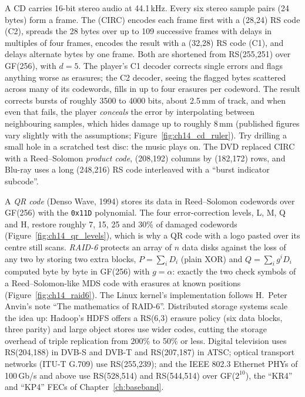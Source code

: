 \begin{inpractice}
A CD carries 16-bit stereo audio at 44.1\,kHz. Every six stereo sample pairs (24 bytes) form a
frame. The  (CIRC) encodes each frame first with a
(28,24) RS code (C2), spreads the 28 bytes over up to 109 successive frames with delays in multiples
of four frames, encodes the result with a (32,28) RS code (C1), and delays alternate bytes by one
frame. Both are shortened from RS(255,251) over GF(256), with $d=5$. The player's C1 decoder corrects
single errors and flags anything worse as erasures; the C2 decoder, seeing the flagged bytes scattered
across many of its codewords, fills in up to four erasures per codeword. The result corrects bursts
of roughly 3500 to 4000 bits, about 2.5\,mm of track, and when even that fails, the player
\emph{conceals} the error by interpolating between neighbouring samples, which hides damage up to
roughly 8\,mm (published figures vary slightly with the assumptions;
Figure~\ref{fig:ch14_cd_ruler}). Try drilling a small hole in a scratched test disc: the music plays
on. The DVD replaced CIRC with a Reed--Solomon \emph{product code}, (208,192) columns by (182,172)
rows, and Blu-ray uses a long (248,216) RS code interleaved with a ``burst indicator subcode''.
\end{inpractice}


\begin{inpractice}
A \emph{QR code} (Denso Wave, 1994) stores its data in Reed--Solomon codewords over GF(256) with
the \texttt{0x11D} polynomial. The four error-correction levels, L, M, Q and H, restore roughly 7, 15,
25 and 30\% of damaged codewords (Figure~\ref{fig:ch14_qr_levels}), which is why a QR code with a
logo pasted over its centre still scans. \emph{RAID-6} protects an array of $n$ data disks against
the loss of any two by storing two extra blocks, $P=\sum_iD_i$ (plain XOR) and $Q=\sum_i g^iD_i$
computed byte by byte in GF(256) with $g=\alpha$: exactly the two check symbols of a
Reed--Solomon-like MDS code with erasures at known positions (Figure~\ref{fig:ch14_raid6}). The Linux
kernel's implementation follows H.~Peter Anvin's note ``The mathematics of RAID-6''. Distributed
storage systems scale the idea up: Hadoop's HDFS offers a RS(6,3) erasure policy (six data blocks,
three parity) and large object stores use wider codes, cutting the storage overhead of triple
replication from 200\% to 50\% or less. Digital television uses RS(204,188) in DVB-S and DVB-T and
RS(207,187) in ATSC; optical transport networks (ITU-T G.709) use RS(255,239); and the IEEE 802.3
Ethernet PHYs of 100\,Gb/s and above use RS(528,514) and RS(544,514) over GF($2^{10}$), the ``KR4''
and ``KP4'' FECs of Chapter~\ref{ch:baseband}.
\end{inpractice}

